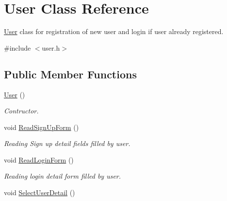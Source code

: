 \hypertarget{classUser}{\section{User Class Reference}
\label{classUser}
}


\hyperlink{classUser}{User} class for registration of new user and login if user already registered.  




{\ttfamily \#include $<$user.\-h$>$}

\subsection*{Public Member Functions}
\begin{DoxyCompactItemize}
\item 
\hypertarget{classUser_a4a0137053e591fbb79d9057dd7d2283d}{\hyperlink{classUser_a4a0137053e591fbb79d9057dd7d2283d}{User} ()}\label{classUser_a4a0137053e591fbb79d9057dd7d2283d}

\begin{DoxyCompactList}\small\item\em Contructor. \end{DoxyCompactList}\item 
\hypertarget{classUser_a47dc91d2a8a9a57c1f98e20637eed2f9}{void \hyperlink{classUser_a47dc91d2a8a9a57c1f98e20637eed2f9}{Read\-Sign\-Up\-Form} ()}\label{classUser_a47dc91d2a8a9a57c1f98e20637eed2f9}

\begin{DoxyCompactList}\small\item\em Reading Sign up detail fields filled by user. \end{DoxyCompactList}\item 
\hypertarget{classUser_aeeed3a3df27744872fc5b5664666d3cb}{void \hyperlink{classUser_aeeed3a3df27744872fc5b5664666d3cb}{Read\-Login\-Form} ()}\label{classUser_aeeed3a3df27744872fc5b5664666d3cb}

\begin{DoxyCompactList}\small\item\em Reading login detail form filled by user. \end{DoxyCompactList}\item 
\hypertarget{classUser_aa2298924a6d8c8acef317a061b06710f}{void \hyperlink{classUser_aa2298924a6d8c8acef317a061b06710f}{Select\-User\-Detail} ()}\label{classUser_aa2298924a6d8c8acef317a061b06710f}


\end{DoxyCompactItemize}

